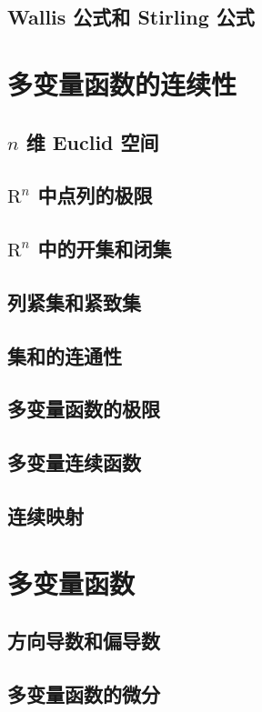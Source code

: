 \documentclass[a4paper, 11pt]{ctexbook}
\begin{document}
        \section{Wallis 公式和 Stirling 公式}
    \chapter{多变量函数的连续性}
        \section{$n$ 维 Euclid 空间}
            
        \section{$\mathrm{R}^n$ 中点列的极限}
            
        \section{$\mathrm{R}^n$ 中的开集和闭集}
            
        \section{列紧集和紧致集}
            
        \section{集和的连通性}
            
        \section{多变量函数的极限}
        \section{多变量连续函数}
        \section{连续映射}
    \chapter{多变量函数}
        \section{方向导数和偏导数}
        \section{多变量函数的微分}
\end{document}
